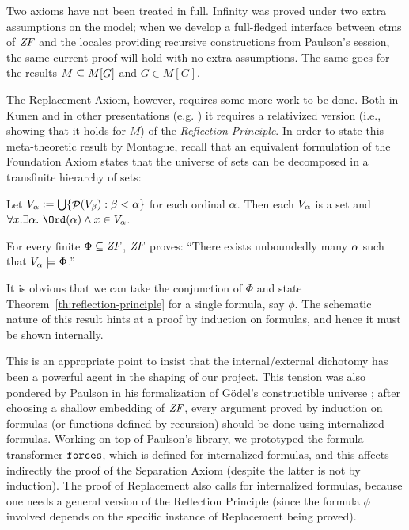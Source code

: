 
Two axioms have not been treated in full. Infinity was proved under
two extra assumptions on the model; when we develop a full-fledged
interface between ctms of $\mathit{ZF}$  and the locales 
providing recursive constructions from Paulson's
 session, the same current proof will hold
with no extra assumptions. The same goes for the results $M\subseteq M[G]$
and $G\in M[G]$. 

The Replacement Axiom, however, requires some more work to be
done. Both
in Kunen and in other presentations (e.g. \cite{neeman-course}) it
requires a relativized version (i.e., showing that it holds for $M$)
of the \emph{Reflection Principle}. In order to state this
meta-theoretic result by Montague, recall that an equivalent
formulation of the Foundation Axiom states that the universe of sets
can be decomposed in a transfinite hierarchy of sets:
\begin{theorem}
  Let $V_{\alpha}\mathrel{\mathop:}=\mathop{\textstyle\bigcup}\{\mathop{\mathcal{P}}(V_\beta) : \beta<\alpha\}$ for each ordinal
  $\alpha$. Then each $V_\alpha$ is a set and 
  $\forall x. \exists\al .\ \Ord(\al) \y x\in V_\al$.  
\end{theorem}
\begin{theorem}\label{th:reflection-principle}
  For every finite $\Phi\subseteq\mathit{ZF}$, $\mathit{ZF}$ proves: ``There exists
  unboundedly many $\alpha$ such that $V_\alpha\models \Phi$.''
\end{theorem}

It is obvious that we can take the conjunction of $\Phi$ and state
Theorem~\ref{th:reflection-principle} for a single formula, say $\phi$.
The schematic nature of this result
hints at a proof by induction on formulas, and hence it must be shown
internally. 

This is an appropriate point to insist that the internal/external
dichotomy has been a powerful agent in the shaping of our project.
This tension was also pondered by Paulson in his formalization of
G\"odel's constructible universe \cite{paulson_2003}; after choosing a
shallow embedding of $\mathit{ZF}$, every argument proved by induction on
formulas (or functions defined by recursion) should be done using
internalized formulas. Working on top of Paulson's library, we
prototyped the formula-transformer $\mathop{\mathtt{forces}}$, which is defined for
internalized formulas, and this affects indirectly the proof of the
Separation Axiom (despite the latter is not by induction). The proof
of Replacement also calls for internalized formulas, because one needs
a general version of the Reflection Principle (since the formula
$\phi$ involved depends on the specific instance of Replacement being
proved).

